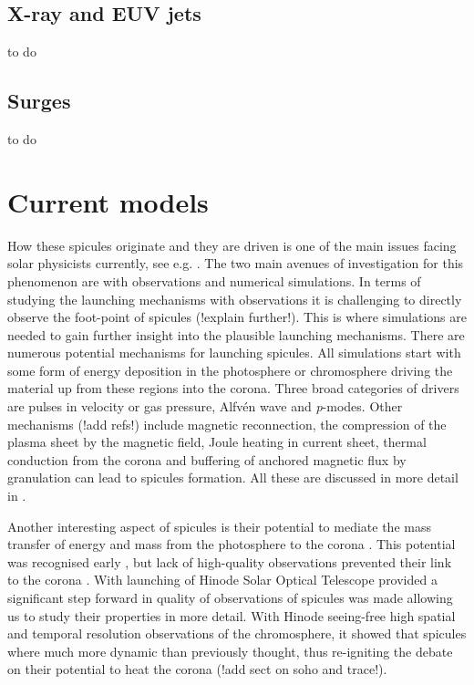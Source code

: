 \documentclass[12pt]{ociamthesis}
\newcommand{\Alfven}{Alfv\'{e}n }
\begin{document}
\subsection{X-ray and EUV jets}
\label{subsec:euv}
to do
\subsection{Surges}
\label{subsec:surge}
to do
\section{Current models}
\label{sec:models}
How these spicules originate and they are driven is one of the main issues facing solar physicists currently, see e.g. \citep{kuz2017ApJ,Tsiropoula2012,Martinez-Sykora2017}. The two main avenues of investigation for this phenomenon are with observations and numerical simulations. In terms of studying the launching mechanisms with observations it is challenging to directly observe the foot-point of spicules (!explain further!). This is where simulations are needed to gain further insight into the plausible launching mechanisms. There are numerous potential mechanisms for launching spicules. All simulations start with some form of energy deposition in the photosphere or chromosphere driving the material up from these regions into the corona. Three broad categories of drivers are pulses in velocity or gas pressure, \Alfven wave and \textit{p}-modes. Other mechanisms (!add refs!) include magnetic reconnection, the compression of the plasma sheet by the magnetic field, Joule heating in current sheet, thermal conduction from the corona and buffering of anchored magnetic flux by granulation can lead to spicules formation. All these are discussed in more detail in \cite{Sterling_2000SoPh}. \\
\par Another interesting aspect of spicules is their potential to mediate the mass transfer of energy and mass from the photosphere to the corona \citep{Pereira2012, Pontieu2004Natur}. This potential was recognised early \citep{Beckers1968}, but lack of high-quality observations prevented their link to the corona \citep{Withbroe1983ApJ}. With launching of Hinode Solar Optical Telescope provided a significant step forward in quality of observations of spicules was made allowing us to study their properties in more detail. With Hinode seeing-free high spatial and temporal resolution observations of the chromosphere, it showed that spicules where much more dynamic than previously thought, thus re-igniting the debate on their potential to heat the corona \citep{Pontieu2007PASJ} (!add sect on soho and trace!). \\
\end{document}
